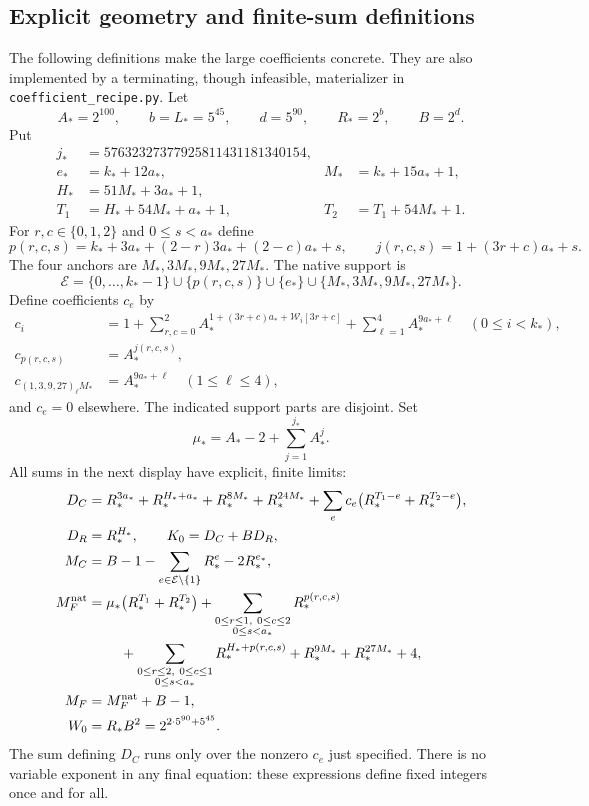 \documentclass[11pt]{article}
\theoremstyle{remark}\newtheorem{remark}[theorem]{Remark}
\begin{document}
\subsection{Explicit geometry and finite-sum definitions}

The following definitions make the large coefficients concrete. They are also implemented by a terminating, though infeasible, materializer in \texttt{coefficient\_recipe.py}. Let
\[
 A_*=2^{100},\qquad b=L_*=5^{45},\qquad d=5^{90},
 \qquad R_*=2^b,\qquad B=2^d.
\]
Put
\begin{align*}
 j_*&=57632327377925811431181340154,\\
 e_*&=k_*+12a_*,& M_*&=k_*+15a_*+1,\\
 H_*&=51M_*+3a_*+1,\\
 T_1&=H_*+54M_*+a_*+1,&T_2&=T_1+54M_*+1.
\end{align*}
For $r,c\in\{0,1,2\}$ and $0\le s<a_*$ define
\[
 p(r,c,s)=k_*+3a_*+(2-r)3a_*+(2-c)a_*+s,
 \qquad j(r,c,s)=1+(3r+c)a_*+s.
\]
The four anchors are $M_*,3M_*,9M_*,27M_*$. The native support is
\[
 \mathcal E=\{0,\ldots,k_*-1\}\cup\{p(r,c,s)\}\cup
 \{e_*\}\cup\{M_*,3M_*,9M_*,27M_*\}.
\]
Define coefficients $c_e$ by
\begin{align*}
 c_i&=1+\sum_{r,c=0}^2 A_*^{1+(3r+c)a_*+\mathcal W_i[3r+c]}
             +\sum_{\ell=1}^4 A_*^{9a_*+\ell}\quad(0\le i<k_*),\\
 c_{p(r,c,s)}&=A_*^{j(r,c,s)},\\
 c_{(1,3,9,27)_\ell M_*}&=A_*^{9a_*+\ell}\quad(1\le\ell\le4),
\end{align*}
and $c_e=0$ elsewhere. The indicated support parts are disjoint. Set
\[
 \mu_*=A_*-2+\sum_{j=1}^{j_*} A_*^j.
\]
All sums in the next display have explicit, finite limits:
\begin{align*}
 D_C={}&R_*^{3a_*}+R_*^{H_*+a_*}+R_*^{8M_*}+R_*^{24M_*}
       +\sum_e c_e\bigl(R_*^{T_1-e}+R_*^{T_2-e}\bigr),\\
 D_R={}&R_*^{H_*},\qquad K_0=D_C+BD_R,\\
 M_C={}&B-1-\sum_{e\in\mathcal E\setminus\{1\}}R_*^e-2R_*^{e_*},\\
 M_F^{\rm nat}={}&\mu_*\bigl(R_*^{T_1}+R_*^{T_2}\bigr)
       +\sum_{\substack{0\le r\le1,\ 0\le c\le2\\0\le s<a_*}}R_*^{p(r,c,s)}\\
 &\quad+\sum_{\substack{0\le r\le2,\ 0\le c\le1\\0\le s<a_*}}R_*^{H_*+p(r,c,s)}
       +R_*^{9M_*}+R_*^{27M_*}+4,\\
 M_F={}&M_F^{\rm nat}+B-1,\\
 W_0={}&R_*B^2=2^{2\cdot5^{90}+5^{45}}.
\end{align*}
The sum defining $D_C$ runs only over the nonzero $c_e$ just specified. There is no variable exponent in any final equation: these expressions define fixed integers once and for all.
\end{document}
